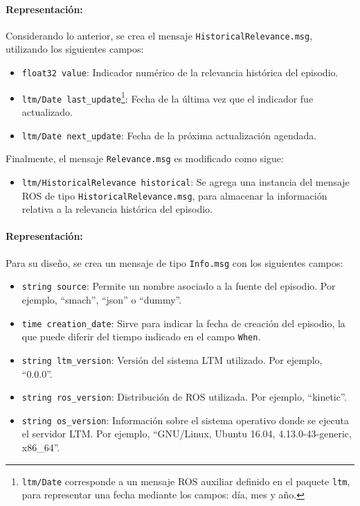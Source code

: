 \paragraph{Representación:}
Considerando lo anterior, se crea el mensaje \texttt{HistoricalRelevance.msg}, utilizando los siguientes campos:
\begin{itemize}
	\item \texttt{float32 value}: Indicador numérico de la relevancia histórica del episodio.
	\item \texttt{ltm/Date last\_update}\footnote{\texttt{ltm/Date} corresponde a un mensaje ROS auxiliar definido en el paquete \texttt{ltm}, para representar una fecha mediante los campos: día, mes y año.}: Fecha de la última vez que el indicador fue actualizado.
	\item \texttt{ltm/Date next\_update}: Fecha de la próxima actualización agendada.
\end{itemize}

Finalmente, el mensaje \texttt{Relevance.msg} es modificado como sigue:
\begin{itemize}
	\item \texttt{ltm/HistoricalRelevance historical}: Se agrega una instancia del mensaje ROS de tipo \texttt{HistoricalRelevance.msg}, para almacenar la información relativa a la relevancia histórica del episodio.
\end{itemize}

\paragraph{Representación:}
Para su diseño, se crea un mensaje de tipo \texttt{Info.msg} con los siguientes campos:
\begin{itemize}
	\item \texttt{string source}: Permite un nombre asociado a la fuente del episodio. Por ejemplo, ``smach'', ``json'' o ``dummy''.
	\item \texttt{time creation\_date}: Sirve para indicar la fecha de creación del episodio, la que puede diferir del tiempo indicado en el campo \texttt{When}.
	\item \texttt{string ltm\_version}: Versión del sistema LTM utilizado. Por ejemplo, ``0.0.0''.
	\item \texttt{string ros\_version}: Distribución de ROS utilizada. Por ejemplo, ``kinetic''.
	\item \texttt{string os\_version}: Información sobre el sistema operativo donde se ejecuta el servidor LTM. Por ejemplo, ``GNU/Linux, Ubuntu 16.04, 4.13.0-43-generic, x86\_64''.
\end{itemize}

